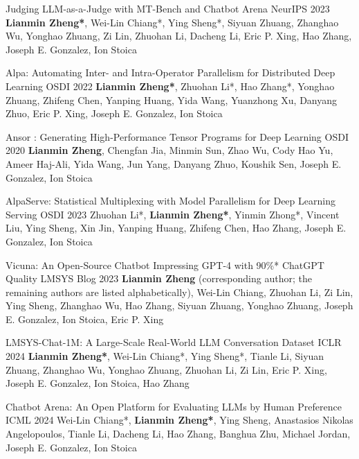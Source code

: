 
\begin{cventries}


\cventry
{}
{Judging LLM-as-a-Judge with MT-Bench and Chatbot Arena} %
{NeurIPS 2023} %
{} %
{\textbf{Lianmin Zheng*}, Wei-Lin Chiang*, Ying Sheng*, Siyuan Zhuang, Zhanghao Wu, Yonghao Zhuang, Zi Lin, Zhuohan Li, Dacheng Li, Eric P. Xing, Hao Zhang, Joseph E. Gonzalez, Ion Stoica}

\cventry
{}
{Alpa: Automating Inter- and Intra-Operator Parallelism for Distributed Deep Learning} %
{OSDI 2022} %
{} %
{\textbf{Lianmin Zheng*}, Zhuohan Li*, Hao Zhang*, Yonghao Zhuang, Zhifeng Chen, Yanping Huang, Yida Wang, Yuanzhong Xu, Danyang Zhuo, Eric P. Xing, Joseph E. Gonzalez, Ion Stoica}

\cventry
{}
{Ansor : Generating High-Performance Tensor Programs for Deep Learning} %
{OSDI 2020} %
{} %
{\textbf{Lianmin Zheng}, Chengfan Jia, Minmin Sun, Zhao Wu, Cody Hao Yu, Ameer Haj-Ali, Yida Wang, Jun Yang, Danyang Zhuo, Koushik Sen, Joseph E. Gonzalez, Ion Stoica}

\cventry
{}
{AlpaServe: Statistical Multiplexing with Model Parallelism for Deep Learning Serving} %
{OSDI 2023} %
{} %
{Zhuohan Li*, \textbf{Lianmin Zheng*}, Yinmin Zhong*, Vincent Liu, Ying Sheng, Xin Jin, Yanping Huang, Zhifeng Chen, Hao Zhang, Joseph E. Gonzalez, Ion Stoica}

\cventry
{}
{Vicuna: An Open-Source Chatbot Impressing GPT-4 with 90\%* ChatGPT Quality} %
{LMSYS Blog 2023} %
{} %
{\textbf{Lianmin Zheng} (corresponding author; the remaining authors are listed alphabetically), Wei-Lin Chiang, Zhuohan Li, Zi Lin, Ying Sheng, Zhanghao Wu, Hao Zhang, Siyuan Zhuang, Yonghao Zhuang, Joseph E. Gonzalez, Ion Stoica, Eric P. Xing}

\cventry
{}
{LMSYS-Chat-1M: A Large-Scale Real-World LLM Conversation Dataset} %
{ICLR 2024} %
{} %
{\textbf{Lianmin Zheng*}, Wei-Lin Chiang*, Ying Sheng*, Tianle Li, Siyuan Zhuang, Zhanghao Wu, Yonghao Zhuang, Zhuohan Li, Zi Lin, Eric P. Xing, Joseph E. Gonzalez, Ion Stoica, Hao Zhang}

\cventry
{}
{Chatbot Arena: An Open Platform for Evaluating LLMs by Human Preference} %
{ICML 2024} %
{} %
{Wei-Lin Chiang*, \textbf{Lianmin Zheng*}, Ying Sheng, Anastasios Nikolas Angelopoulos, Tianle Li, Dacheng Li, Hao Zhang, Banghua Zhu, Michael Jordan, Joseph E. Gonzalez, Ion Stoica}


\end{cventries}



